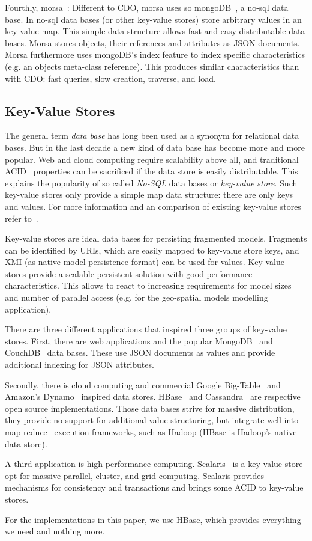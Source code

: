 Fourthly, morsa~\cite{morsa2011}: Different to CDO, morsa uses so mongoDB~\cite{mongodb2010}, a no-sql data base. In no-sql data bases (or other key-value stores) store arbitrary values in an key-value map. This simple data structure allows fast and easy distributable data bases. Morsa stores objects, their references and attributes as JSON documents. Morsa furthermore uses mongoDB's index feature to index specific characteristics (e.g. an objects meta-class reference). This produces similar characteristics than with CDO: fast queries, slow creation, traverse, and load.

\subsection{Key-Value Stores}

The general term \emph{data base} has long been used as a synonym for relational data bases. But in the last decade a new kind of data base has become more and more popular. Web and cloud computing require scalability above all, and traditional ACID~\cite{ACID} properties can be sacrificed if the data store is easily distributable. This explains the popularity of so called \emph{No-SQL} data bases or \emph{key-value store}. Such key-value stores only provide a simple map data structure: there are only keys and values. For more information and an comparison of existing key-value stores refer to~\cite{nosql2010}.

Key-value stores are ideal data bases for persisting fragmented models. Fragments can be identified by URIs, which are easily mapped to key-value store keys, and XMI (as native model persistence format) can be used for values. Key-value stores provide a scalable persistent solution with good performance characteristics. This allows to react to increasing requirements for model sizes and number of parallel access (e.g. for the geo-spatial models modelling application).

There are three different applications that inspired three groups of key-value stores. First, there are web applications and the popular MongoDB~\cite{mongodb2010} and CouchDB~\cite{couchdb2010} data bases. These use JSON documents as values and provide additional indexing for JSON attributes.

Secondly, there is cloud computing and commercial Google Big-Table~\cite{bibtable2006} and Amazon's Dynamo~\cite{dynamo2007} inspired data stores. HBase~\cite{hbase2008} and Cassandra~\cite{cassandra2009} are respective open source implementations. Those data bases strive for massive distribution, they provide no support for additional value structuring, but integrate well into map-reduce~\cite{mapreduce} execution frameworks, such as Hadoop (HBase is Hadoop's native data store). 

A third application is high performance computing. Scalaris~\cite{ScalarisTransactions2008} is a key-value store opt for massive parallel, cluster, and grid computing. Scalaris provides mechanisms for consistency and transactions and brings some ACID to key-value stores.

For the implementations in this paper, we use HBase, which provides everything we need and nothing more.